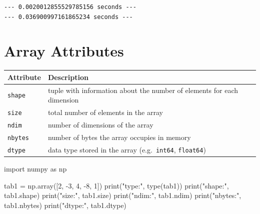 \documentclass[
  english,
  letterpaper,
  DIV=11,
  numbers=noendperiod]{scrreprt}
\newenvironment{Shaded}{\begin{snugshade}}{\end{snugshade}}
\newcommand{\BuiltInTok}[1]{\textcolor[rgb]{0.00,0.23,0.31}{#1}}
\newcommand{\DecValTok}[1]{\textcolor[rgb]{0.68,0.00,0.00}{#1}}
\newcommand{\ImportTok}[1]{\textcolor[rgb]{0.00,0.46,0.62}{#1}}
\newcommand{\NormalTok}[1]{\textcolor[rgb]{0.00,0.23,0.31}{#1}}
\newcommand{\OperatorTok}[1]{\textcolor[rgb]{0.37,0.37,0.37}{#1}}
\newcommand{\StringTok}[1]{\textcolor[rgb]{0.13,0.47,0.30}{#1}}
\newcounter{none} %
\begin{document}
\begin{verbatim}
--- 0.0020012855529785156 seconds ---
--- 0.036900997161865234 seconds ---
\end{verbatim}

\chapter{Array Attributes}\label{array-attributes}

{\def\LTcaptype{none} %
\begin{longtable}[]{@{}
  >{\raggedright\arraybackslash}p{}
  >{\raggedright\arraybackslash}p{}@{}}
\toprule\noalign{}
\begin{minipage}[b]{\linewidth}\raggedright
Attribute
\end{minipage} & \begin{minipage}[b]{\linewidth}\raggedright
Description
\end{minipage} \\
\midrule\noalign{}
\endhead
\bottomrule\noalign{}
\endlastfoot
\texttt{shape} & tuple with information about the number of elements for
each dimension \\
\texttt{size} & total number of elements in the array \\
\texttt{ndim} & number of dimensions of the array \\
\texttt{nbytes} & number of bytes the array occupies in memory \\
\texttt{dtype} & data type stored in the array (e.g.~\texttt{int64},
\texttt{float64}) \\
\end{longtable}
}

\begin{Shaded}
\begin{Highlighting}[]
\ImportTok{import}\NormalTok{ numpy }\ImportTok{as}\NormalTok{ np}

\NormalTok{tab1 }\OperatorTok{=}\NormalTok{ np.array([}\DecValTok{2}\NormalTok{, }\OperatorTok{{-}}\DecValTok{3}\NormalTok{, }\DecValTok{4}\NormalTok{, }\OperatorTok{{-}}\DecValTok{8}\NormalTok{, }\DecValTok{1}\NormalTok{])}
\BuiltInTok{print}\NormalTok{(}\StringTok{"type:"}\NormalTok{, }\BuiltInTok{type}\NormalTok{(tab1))}
\BuiltInTok{print}\NormalTok{(}\StringTok{"shape:"}\NormalTok{, tab1.shape)}
\BuiltInTok{print}\NormalTok{(}\StringTok{"size:"}\NormalTok{, tab1.size)}
\BuiltInTok{print}\NormalTok{(}\StringTok{"ndim:"}\NormalTok{, tab1.ndim)}
\BuiltInTok{print}\NormalTok{(}\StringTok{"nbytes:"}\NormalTok{, tab1.nbytes)}
\BuiltInTok{print}\NormalTok{(}\StringTok{"dtype:"}\NormalTok{, tab1.dtype)}
\end{Highlighting}
\end{Shaded}
\end{document}
